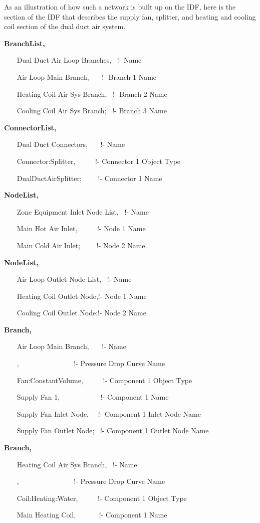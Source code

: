 As an illustration of how such a network is built up on the IDF, here is the section of the IDF that describes the supply fan, splitter, and heating and cooling coil section of the dual duct air system.

\textbf{BranchList,}

~~~ Dual Duct Air Loop Branches,~ !- Name

~~~ Air Loop Main Branch,~~~ !- Branch 1 Name

~~~ Heating Coil Air Sys Branch,~ !- Branch 2 Name

~~~ Cooling Coil Air Sys Branch;~ !- Branch 3 Name

\textbf{ConnectorList,}

~~~ Dual Duct Connectors,~~~ !- Name

~~~ Connector:Splitter,~~~~~ !- Connector 1 Object Type

~~~ DualDuctAirSplitter;~~~~ !- Connector 1 Name

\textbf{NodeList,}

~~~ Zone Equipment Inlet Node List,~ !- Name

~~~ Main Hot Air Inlet,~~~~~ !- Node 1 Name

~~~ Main Cold Air Inlet;~~~~ !- Node 2 Name

\textbf{NodeList,}

~~~ Air Loop Outlet Node List,~ !- Name

~~~ Heating Coil Outlet Node,!- Node 1 Name

~~~ Cooling Coil Outlet Node;!- Node 2 Name

\textbf{Branch,}

~~~ Air Loop Main Branch,~~~ !- Name

~~~ ,~~~~~~~~~~~~~~~ !- Pressure Drop Curve Name

~~~ Fan:ConstantVolume,~~~~~ !- Component 1 Object Type

~~~ Supply Fan 1,~~~~~~~~~~~ !- Component 1 Name

~~~ Supply Fan Inlet Node,~~ !- Component 1 Inlet Node Name

~~~ Supply Fan Outlet Node;~ !- Component 1 Outlet Node Name


\textbf{Branch,}

~~~ Heating Coil Air Sys Branch,~ !- Name

~~~ ,~~~~~~~~~~~~~~~ !- Pressure Drop Curve Name

~~~ Coil:Heating:Water,~~~~~ !- Component 1 Object Type

~~~ Main Heating Coil,~~~~~~ !- Component 1 Name

